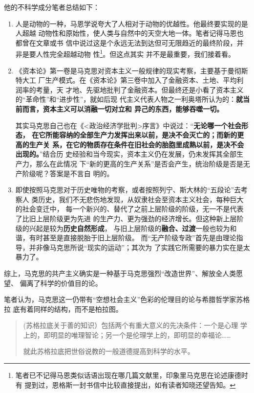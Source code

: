 他的不科学成分笔者总结如下：
\begin{enumerate}
\item 人是动物的一种，马恩学说夸大了人相对于动物的优越性。他最终要实现的是人超越
  动物性和原始性，使人类与自然中的天空大地一体。笔者记得马恩也都曾在文章或书
  信中说过这是个永远无法到达但可无限趋近的最终阶段，并非是要人性完全超越动物
  性\footnote{笔者已不记得马恩类似话语出现在哪几篇文献里，印象里马克思在论述康德时有
    提到过，恩格斯一封书信中比较直接提出，如有读者知晓还望告知。}。但这点其实
  并不是最重要，我们接着看。

\item 《资本论》第一卷是马克思对资本主义一般规律的现实考察，主要基于曼彻斯特大工
  厂生产模式。在《资本论》第三卷中加入了金融资本、土地、平均利润率的考量，天
  才地、先驱地批判了金融资本。但最终还是小看了资本主义的“革命性”和“进步性”，就如后现
  代主义代表人物之一利奥塔所认为的：\textbf{就当前而言，资本主义可以消融一切对立和
    异己的东西，能够吞噬一切。}

  其实马克思自己也在《<政治经济学批判>序言》中说过：“\textbf{无论哪一个社会形态，
    在它所能容纳的全部生产力发挥出来以前，是决不会灭亡的；而新的更高的生产关
    系，在它的物质存在条件在旧社会的胎胞里成熟以前，是决不会出现的。}”结合历
  史经验和当今现实，资本主义仍在发展，仍未发挥其全部生产力，那么在此情况
  下“新的更高的生产关系”是否会产生，统治阶级是否是无产阶级呢？答案是不言自
  明的。

\item 即使按照马克思对于历史唯物的考察，或者按照列宁、斯大林的“五段论”去考察人
  类历史，我们不无悲伤地发现，从奴隶社会至资本主义社会，每种巨大的社会变迁中，
  每一个新兴的、替代了之前上层阶级的阶级，无一不是代表了比旧上层阶级更为先进
  的生产力、更为强劲的经济增长。但这种新上层阶级的兴起是较为\textbf{历史自然形成}，
  与旧上层阶级的\textbf{融合、过渡}一般也较为和谐，有时甚至是直接脱胎于旧上层阶级。
  而“无产阶级专政”首先是由理论指导，并非像马克思所说“现实的运动”；其次为
  了实践它所需要的暴力实在是太暴力了。
\end{enumerate}

综上，马克思的共产主义确实是一种基于马克思强烈“改造世界”、解放全人类愿望、
偏离了科学的价值目的论。

笔者认为，马克思这一仍带有“空想社会主义”色彩的伦理目的论与希腊哲学家苏格拉
底有着同样的结构，而不是柏拉图。
\begin{quotation}
  (苏格拉底关于善的知识）包括两个有重大意义的先决条件：一个是心理
  学上的，即明显的唯理智论；另一个是伦理学上的，即明显的幸福论……

  就此苏格拉底把世俗说教的一般道德提高到科学的水平。\cite[113]{wendeerban}
\end{quotation}

